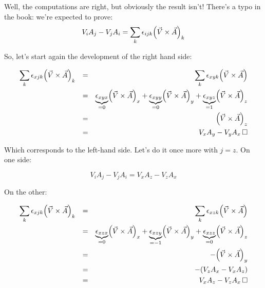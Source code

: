 \documentclass[solutions.tex]{subfiles}
\begin{document}
Well, the computations are right, but obviously the result isn't! There's
a typo in the book: we're expected to prove:
\[
	V_iA_j - V_jA_i = \sum_k \epsilon_{ijk}\Bigl(\vec{V} \times \vec{A}\Bigr)_k
\]

So, let's start again the development of the right hand side:

\begin{equation*}\begin{aligned}
	\sum_k \epsilon_{xjk}\Bigl(\vec{V} \times \vec{A}\Bigr)_k &&=&&
		\sum_k \epsilon_{xyk}\Bigl(\vec{V} \times \vec{A}\Bigr) \\
	~ &&=&&
		\underbrace{\epsilon_{xyx}}_{=0}\Bigl(\vec{V} \times \vec{A}\Bigr)_x
		+\underbrace{\epsilon_{xyy}}_{=0}\Bigl(\vec{V} \times \vec{A}\Bigr)_y
		+\underbrace{\epsilon_{xyz}}_{=1}\Bigl(\vec{V} \times \vec{A}\Bigr)_z \\
	~ &&=&& \Bigl(\vec{V} \times \vec{A}\Bigr)_z\\
	~ &&=&& V_xA_y - V_yA_x \qed
\end{aligned}\end{equation*}

Which corresponds to the left-hand side. Let's do it once more with $j=z$.
On one side:

\[	V_iA_j - V_jA_i = V_xA_z - V_zA_x \]

On the other:

\begin{equation*}\begin{aligned}
	\sum_k \epsilon_{xjk}\Bigl(\vec{V} \times \vec{A}\Bigr)_k &&=&&
		\sum_k \epsilon_{xzk}\Bigl(\vec{V} \times \vec{A}\Bigr) \\
	~ &&=&&
		\underbrace{\epsilon_{xzx}}_{=0}\Bigl(\vec{V} \times \vec{A}\Bigr)_x
		+\underbrace{\epsilon_{xzy}}_{=-1}\Bigl(\vec{V} \times \vec{A}\Bigr)_y
		+\underbrace{\epsilon_{xzz}}_{=0}\Bigl(\vec{V} \times \vec{A}\Bigr)_z \\
	~ &&=&& -\Bigl(\vec{V} \times \vec{A}\Bigr)_y\\
	~ &&=&& -(V_zA_x - V_xA_z) \\
	~ &&=&& V_xA_z - V_zA_x  \qed
\end{aligned}\end{equation*}
\end{document}
